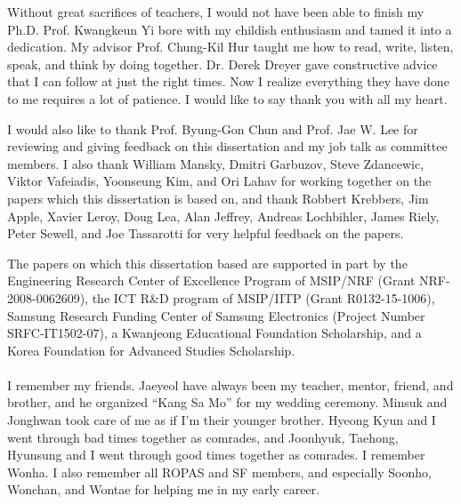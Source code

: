 \acknowledgement

Without great sacrifices of teachers, I would not have been able to finish my Ph.D.  Prof. Kwangkeun
Yi bore with my childish enthusiasm and tamed it into a dedication.  My advisor Prof. Chung-Kil Hur
taught me how to read, write, listen, speak, and think by doing together.  Dr. Derek Dreyer gave
constructive advice that I can follow at just the right times.  Now I realize everything they have
done to me requires a lot of patience.  I would like to say thank you with all my heart.

I would also like to thank Prof. Byung-Gon Chun and Prof. Jae W. Lee for reviewing and giving
feedback on this dissertation and my job talk as committee members.  I also thank William Mansky,
Dmitri Garbuzov, Steve Zdancewic, Viktor Vafeiadis, Yoonseung Kim, and Ori Lahav for working
together on the papers which this dissertation is based on, and thank Robbert Krebbers, Jim Apple,
Xavier Leroy, Doug Lea, Alan Jeffrey, Andreas Lochbihler, James Riely, Peter Sewell, and Joe
Tassarotti for very helpful feedback on the papers.

The papers on which this dissertation based are supported in part by the Engineering Research Center
of Excellence Program of MSIP/NRF (Grant NRF-2008-0062609), the ICT R\&D program of MSIP/IITP (Grant
R0132-15-1006), Samsung Research Funding Center of Samsung Electronics (Project Number
SRFC-IT1502-07), a Kwanjeong Educational Foundation Scholarship, and a Korea Foundation for Advanced
Studies Scholarship.


\paragraph*{}


I remember my friends.  Jaeyeol have always been my teacher, mentor, friend, and brother, and he
organized ``Kang Sa Mo'' for my wedding ceremony.  Minsuk and Jonghwan took care of me as if I'm
their younger brother.  Hyeong Kyun and I went through bad times together as comrades, and Joonhyuk,
Taehong, Hyunsung and I went through good times together as comrades.  I remember Wonha.  I also
remember all ROPAS and SF members, and especially Soonho, Wonchan, and Wontae for helping me in my
early career.


\paragraph*{}

